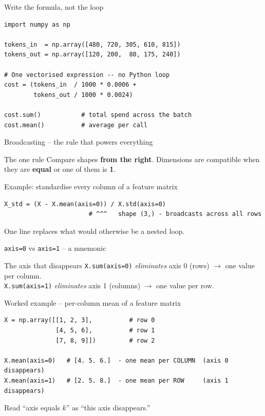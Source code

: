 \documentclass[aspectratio=169,11pt]{beamer}
\begin{document}
\begin{frame}[fragile]{Write the formula, not the loop}
\begin{lstlisting}
import numpy as np

tokens_in  = np.array([480, 720, 305, 610, 815])
tokens_out = np.array([120, 200,  80, 175, 240])

# One vectorised expression -- no Python loop
cost = (tokens_in  / 1000 * 0.0006 +
        tokens_out / 1000 * 0.0024)

cost.sum()           # total spend across the batch
cost.mean()          # average per call
\end{lstlisting}
\end{frame}

\begin{frame}[fragile]{Broadcasting -- the rule that powers everything}
  \begin{block}{The one rule}
    Compare shapes \textbf{from the right}. Dimensions are compatible when they
    are \textbf{equal} or one of them is \textbf{1}.
  \end{block}
  \vspace{6pt}
  \begin{exampleblock}{Example: standardise every column of a feature matrix}
\begin{verbatim}
X_std = (X - X.mean(axis=0)) / X.std(axis=0)
                       # ^^^   shape (3,) - broadcasts across all rows
\end{verbatim}
  \end{exampleblock}
  One line replaces what would otherwise be a nested loop.
\end{frame}

\begin{frame}[fragile]{\texttt{axis=0} vs \texttt{axis=1} -- a mnemonic}
  \begin{block}{The axis that disappears}
    \texttt{X.sum(axis=0)} \emph{eliminates} axis 0 (rows) $\rightarrow$ one value per column.\\
    \texttt{X.sum(axis=1)} \emph{eliminates} axis 1 (columns) $\rightarrow$ one value per row.
  \end{block}
  \vspace{6pt}
  \begin{exampleblock}{Worked example -- per-column mean of a feature matrix}
\begin{verbatim}
X = np.array([[1, 2, 3],          # row 0
              [4, 5, 6],          # row 1
              [7, 8, 9]])         # row 2

X.mean(axis=0)   # [4. 5. 6.]  - one mean per COLUMN  (axis 0 disappears)
X.mean(axis=1)   # [2. 5. 8.]  - one mean per ROW     (axis 1 disappears)
\end{verbatim}
  \end{exampleblock}
  Read ``axis equals $k$'' as ``this axis disappears.''
\end{frame}
\end{document}
